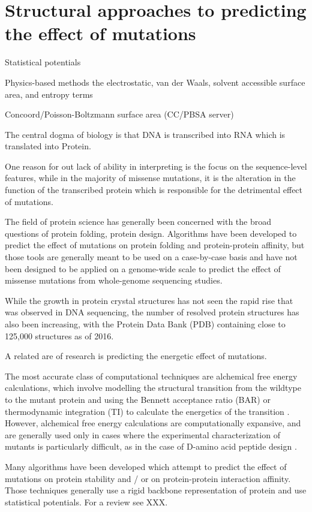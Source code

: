 \section{Structural approaches to predicting the effect of mutations}

Statistical potentials

Physics-based methods
the electrostatic, van der Waals, solvent accessible surface area, and entropy terms

Concoord/Poisson-Boltzmann surface area (CC/PBSA server)

The central dogma of biology is that DNA is transcribed into RNA which is translated into Protein.

One reason for out lack of ability in interpreting is the focus on the sequence-level features, while in the majority of missense mutations, it is the alteration in the function of the transcribed protein which is responsible for the detrimental effect of mutations.

The field of protein science has generally been concerned with the broad questions of protein folding, protein design. Algorithms have been developed to predict the effect of mutations on protein folding and protein-protein affinity, but those tools are generally meant to be used on a case-by-case basis and have not been designed to be applied on a genome-wide scale to predict the effect of missense mutations from whole-genome sequencing studies.

While the growth in protein crystal structures has not seen the rapid rise that was observed in DNA sequencing, the number of resolved protein structures has also been increasing, with the Protein Data Bank (PDB) containing close to 125,000 structures as of 2016.

A related are of research is predicting the energetic effect of mutations.

The most accurate class of computational techniques are alchemical free energy calculations, which involve modelling the structural transition from the wildtype to the mutant protein and using the Bennett acceptance ratio (BAR) or thermodynamic integration (TI) to calculate the energetics of the transition \cite{monticelli_introduction_2013}. However, alchemical free energy calculations are computationally expansive, and are generally used only in cases where the experimental characterization of mutants is particularly difficult, as in the case of D-amino acid peptide design \cite{welch_potent_2007}.

Many algorithms have been developed which attempt to predict the effect of mutations on protein stability and / or on protein-protein interaction affinity. Those techniques generally use a rigid backbone representation of protein and use statistical potentials. For a review see XXX.

